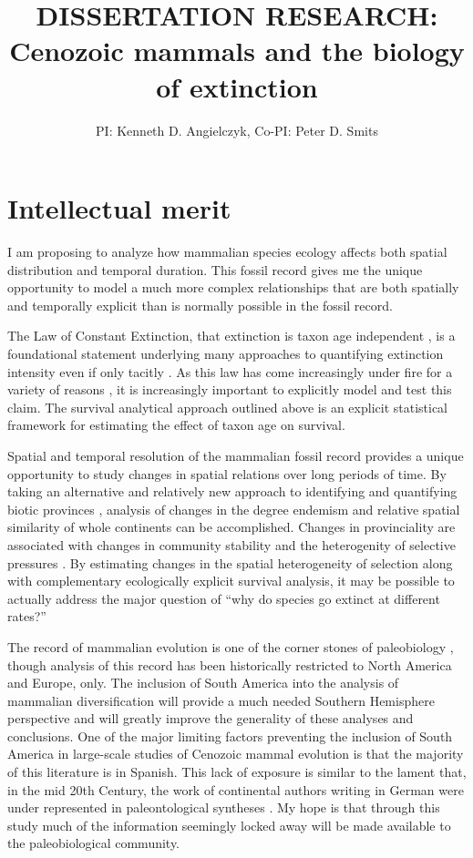 \documentclass[11pt,letterpaper]{article}
\title{\uppercase{Dissertation Research:}\\ Cenozoic mammals and the biology of extinction}
\author{PI: Kenneth D. Angielczyk, Co-PI: Peter D. Smits}
\date{}
\begin{document}
\linenumbers
\modulolinenumbers[2]

\setcounter{secnumdepth}{0}

\maketitle

\section{Intellectual merit}
I am proposing to analyze how mammalian species ecology affects both spatial distribution and temporal duration. This fossil record gives me the unique opportunity to model a much more complex relationships that are both spatially and temporally explicit than is normally possible in the fossil record. 

The Law of Constant Extinction, that extinction is taxon age independent \citep{VanValen1973}, is a foundational statement underlying many approaches to quantifying extinction intensity even if only tacitly \citep{Alroy2014a,Foote1996e,Foote1997c,Foote2000,Raup1975,Sepkoski1975}. As this law has come increasingly under fire for a variety of reasons \citep{Drake2014,Raup1975,Sepkoski1975,Finnegan2008}, it is increasingly important to explicitly model and test this claim. The survival analytical approach outlined above is an explicit statistical framework for estimating the effect of taxon age on survival.

Spatial and temporal resolution of the mammalian fossil record provides a unique opportunity to study changes in spatial relations over long periods of time. By taking an alternative and relatively new approach to identifying and quantifying biotic provinces \citep{Sidor2013,Vilhena2013b,Vilhena2013}, analysis of changes in the degree endemism and relative spatial similarity of whole continents can be accomplished. Changes in provinciality are associated with changes in community stability and the heterogenity of selective pressures \citep{Sidor2013,Vilhena2013}. By estimating changes in the spatial heterogeneity of selection along with complementary ecologically explicit survival analysis, it may be possible to actually address the major question of ``why do species go extinct at different rates?''

The record of mammalian evolution is one of the corner stones of paleobiology \citep{Simpson1944}, though analysis of this record has been historically restricted to North America and Europe, only. The inclusion of South America into the analysis of mammalian diversification will provide a much needed Southern Hemisphere perspective and will greatly improve the generality of these analyses and conclusions. One of the major limiting factors preventing the inclusion of South America in large-scale studies of Cenozoic mammal evolution is that the majority of this literature is in Spanish. This lack of exposure is similar to the lament that, in the mid 20th Century, the work of continental authors writing in German were under represented in paleontological syntheses \citep{Gould1979a}. My hope is that through this study much of the information seemingly locked away will be made available to the paleobiological community.
\end{document}
